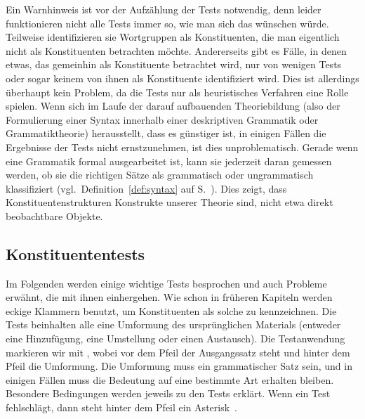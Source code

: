 Ein Warnhinweis ist vor der Aufzählung der Tests notwendig, denn leider funktionieren nicht alle Tests immer so, wie man sich das wünschen würde.
Teilweise identifizieren sie Wortgruppen als Konstituenten, die man eigentlich nicht als Konstituenten betrachten möchte.
Andererseits gibt es Fälle, in denen etwas, das gemeinhin als Konstituente betrachtet wird, nur von wenigen Tests oder sogar keinem von ihnen als Konstituente identifiziert wird.
Dies ist allerdings überhaupt kein Problem, da die Tests nur als heuristisches Verfahren eine Rolle spielen.
Wenn sich im Laufe der darauf aufbauenden Theoriebildung (also der Formulierung einer Syntax innerhalb einer deskriptiven Grammatik oder Grammatiktheorie) herausstellt, dass es günstiger ist, in einigen Fällen die Ergebnisse der Tests nicht ernstzunehmen, ist dies unproblematisch.
Gerade wenn eine Grammatik formal ausgearbeitet ist, kann sie jederzeit daran gemessen werden, ob sie die richtigen Sätze als grammatisch oder ungrammatisch klassifiziert (vgl.\ Definition~\ref{def:syntax} auf S.~\pageref{def:syntax}).
Dies zeigt, dass Konstituentenstrukturen Konstrukte unserer Theorie sind, nicht etwa direkt beobachtbare Objekte.

\subsection{Konstituententests}

\label{sec:konstituententestsimeinzelnen}

Im Folgenden werden einige wichtige Tests besprochen und auch Probleme erwähnt, die mit ihnen einhergehen.
Wie schon in früheren Kapiteln werden eckige Klammern benutzt, um Konstituenten als solche zu kennzeichnen.
Die Tests beinhalten alle eine Umformung des ursprünglichen Materials (entweder eine Hinzufügung, eine Umstellung oder einen Austausch).
Die Testanwendung markieren wir mit , wobei vor dem Pfeil der Ausgangssatz steht und hinter dem Pfeil die Umformung.
Die Umformung muss ein grammatischer Satz sein, und in einigen Fällen muss die Bedeutung auf eine bestimmte Art erhalten bleiben.
Besondere Bedingungen werden jeweils zu den Tests erklärt.
Wenn ein Test fehlschlägt, dann steht hinter dem Pfeil ein Asterisk~\Ast.



